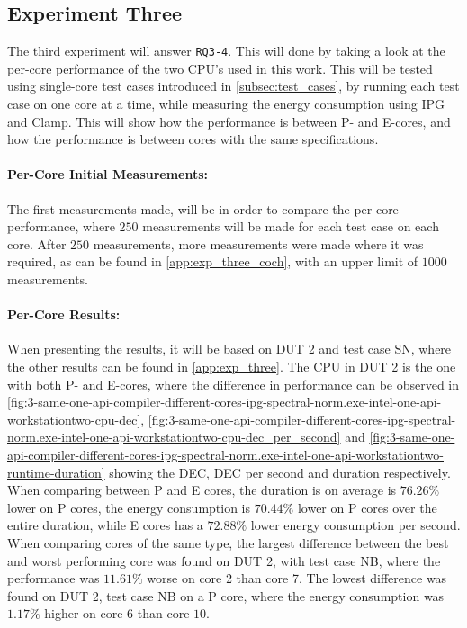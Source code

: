 \subsection{Experiment Three}\label{subsec:exp_three}

The third experiment will answer \texttt{RQ3-4}. This will done by taking a look at the per-core performance of the two CPU's used in this work. This will be tested using single-core test cases introduced in \cref{subsec:test_cases}, by running each test case on one core at a time, while measuring the energy consumption using IPG and Clamp. This will show how the performance is between P- and E-cores, and how the performance is between cores with the same specifications.

\paragraph{Per-Core Initial Measurements:} The first measurements made, will be in order to compare the per-core performance, where $250$ measurements will be made for each test case on each core. After $250$ measurements, more measurements were made where it was required, as can be found in \cref{app:exp_three_coch}, with an upper limit of $1000$ measurements.

\paragraph{Per-Core Results:} When presenting the results, it will be based on DUT 2 and test case SN, where the other results can be found in \cref{app:exp_three}. The CPU in DUT 2 is the one with both P- and E-cores, where the difference in performance can be observed in \cref{fig:3-same-one-api-compiler-different-cores-ipg-spectral-norm.exe-intel-one-api-workstationtwo-cpu-dec}, \cref{fig:3-same-one-api-compiler-different-cores-ipg-spectral-norm.exe-intel-one-api-workstationtwo-cpu-dec_per_second} and \cref{fig:3-same-one-api-compiler-different-cores-ipg-spectral-norm.exe-intel-one-api-workstationtwo-runtime-duration} showing the DEC, DEC per second and duration respectively. When comparing between P and E cores, the duration is on average is $76.26\%$ lower on P cores, the energy consumption is $70.44\%$ lower on P cores over the entire duration, while E cores has a $72.88\%$ lower energy consumption per second. When comparing cores of the same type, the largest difference between the best and worst performing core was found on DUT 2, with test case NB, where the performance was $11.61\%$ worse on core 2 than core 7. The lowest difference  was found on DUT 2, test case NB on a P core, where the energy consumption was $1.17\%$ higher on core $6$ than core $10$.






